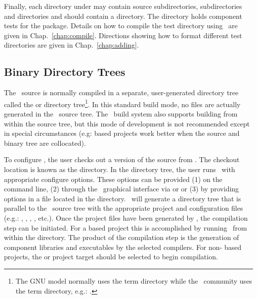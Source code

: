 Finally, each directory under  may contain source
subdirectories,  subdirectories and  directories and should contain a  directory.  The
 directory holds component tests for the package.  Details
on how to compile the test directory using \ctest\ are given
in Chap.~\ref{chap:compile}.  Directions showing how to format
different test directories are given in Chap.~\ref{chap:adding}.

\subsection{Binary Directory Trees} 

The \draco\ source is normally compiled in a separate, user-generated directory
tree called the  or  directory tree\footnote{The GNU model normally uses the term  directory while the \cmake\ community uses the term  directory, e.g.: .}.     In this standard build mode, no files are
actually generated in the \draco\ source tree.  The \draco\ build system also supports building from within the source tree, but this mode of development is not recommended except in special circumstances (e.g:  based projects work better when the source and binary tree are collocated). 

To configure \draco,
the user checks out a version of the source from \svn.  The checkout location is known as the  directory.  In the  directory tree, the user runs \cmake\ with appropriate configure options.  These options can be provided (1) on the command line, (2) through the \cmake\ graphical interface via   or   or (3) by providing options in a   file located in the  directory.  \cmake\ will generate a directory tree
that is parallel to the \draco\ source tree with the appropriate
project and configuration files (e.g.: , , , , etc.).  Once the project files have been generated by \cmake, the compilation step can be initiated.  For a  based project this is accomplished by running \gmake\ from within the  directory.  The product of the compilation step is the generation of component libraries and executables by the selected compilers.  For non- based projects, the  or  project target should be selected to begin compilation.

